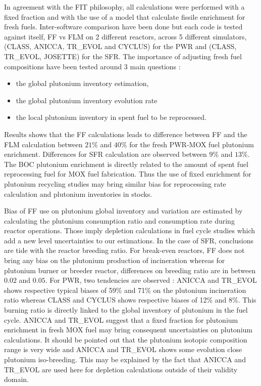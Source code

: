 In agreement with the FIT philosophy, all calculations were performed with a
fixed fraction and with the use of a model that calculate fissile enrichment for
fresh fuels. Inter-software comparison have been done but each code is tested
against itself, \gls{FF} vs \gls{FLM} on 2 different reactors, across 5 different
simulators, (CLASS, ANICCA, TR\_EVOL and CYCLUS) for the \gls{PWR} and (CLASS,
TR\_EVOL, JOSETTE) for the \gls{SFR}. The importance of adjusting fresh fuel
compositions have been tested around 3 main questions : 
\begin{itemize}
    \item the global plutonium inventory estimation,
    \item the global plutonium inventory evolution rate 
    \item the local plutonium inventory in spent fuel to be reprocessed.
\end{itemize}

Results shows that the \gls{FF} calculations leads to difference between
\gls{FF} and the \gls{FLM} calculation between $21\%$ and $40\%$ for the fresh
\gls{PWR}-\gls{MOX} fuel plutonium enrichment. Differences for \gls{SFR}
calculation are observed between $9\%$ and $13\%$.  The \gls{BOC} plutonium
enrichment is directly related to the amount of spent fuel reprocessing fuel for
MOX fuel fabrication. Thus the use of fixed enrichment for plutonium recycling
studies may bring similar bias for reprocessing rate calculation and plutonium
inventories in stocks. 

Bias of \gls{FF} use on plutonium global inventory and variation are estimated
by calculating the plutonium consumption ratio and consumption rate during
reactor operations. Those imply depletion calculations in fuel cycle studies
which add a new level uncertainties to our estimations. In the case of
\gls{SFR}, conclusions are tide with the reactor breeding ratio. For break-even
reactors, \gls{FF} does not bring any bias on the plutonium production of
incineration whereas for plutonium burner or breeder reactor, differences on
breeding ratio are in between $0.02$ and $0.05$. For PWR, two tendencies are
observed : ANICCA and TR\_EVOL shows respective typical biases of 59\% and 71\%
on the plutonium incineration ratio whereas CLASS and CYCLUS shows respective
biases of 12\% and 8\%. This burning ratio is directly linked to the global
inventory of plutonium in the fuel cycle. ANICCA and TR\_EVOL suggest that a
fixed fraction for plutonium enrichment in fresh MOX fuel may bring consequent
uncertainties on plutonium calculations. It should be pointed out that the
plutonium isotopic composition range is very wide and ANICCA and TR\_EVOL shows
some evolution close plutonium iso-breeding. This may be explained by the fact
that ANICCA and TR\_EVOL are used here for depletion calculations outside of
their validity domain.        

